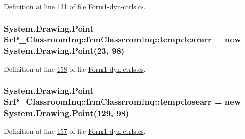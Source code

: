 \-Definition at line \hyperlink{_form1-dyn-ctrls_8cs_source_l00131}{131} of file \hyperlink{_form1-dyn-ctrls_8cs_source}{\-Form1-\/dyn-\/ctrls.\-cs}.

\hypertarget{class_sr_p___classroom_inq_1_1frm_classrrom_inq_a189c01a3745fca62a8250be6a3517894}{
\subsubsection[{tempcleararr}]{\setlength{\rightskip}{0pt plus 5cm}\-System.\-Drawing.\-Point {\bf \-Sr\-P\-\_\-\-Classroom\-Inq\-::frm\-Classrrom\-Inq\-::tempcleararr} = new \-System.\-Drawing.\-Point(23, 98)}}
\label{class_sr_p___classroom_inq_1_1frm_classrrom_inq_a189c01a3745fca62a8250be6a3517894}


\-Definition at line \hyperlink{_form1-dyn-ctrls_8cs_source_l00158}{158} of file \hyperlink{_form1-dyn-ctrls_8cs_source}{\-Form1-\/dyn-\/ctrls.\-cs}.

\hypertarget{class_sr_p___classroom_inq_1_1frm_classrrom_inq_a6ad2bdb537cfc35b174dd16dd8e03904}{
\subsubsection[{tempclosearr}]{\setlength{\rightskip}{0pt plus 5cm}\-System.\-Drawing.\-Point {\bf \-Sr\-P\-\_\-\-Classroom\-Inq\-::frm\-Classrrom\-Inq\-::tempclosearr} = new \-System.\-Drawing.\-Point(129, 98)}}
\label{class_sr_p___classroom_inq_1_1frm_classrrom_inq_a6ad2bdb537cfc35b174dd16dd8e03904}


\-Definition at line \hyperlink{_form1-dyn-ctrls_8cs_source_l00157}{157} of file \hyperlink{_form1-dyn-ctrls_8cs_source}{\-Form1-\/dyn-\/ctrls.\-cs}.

